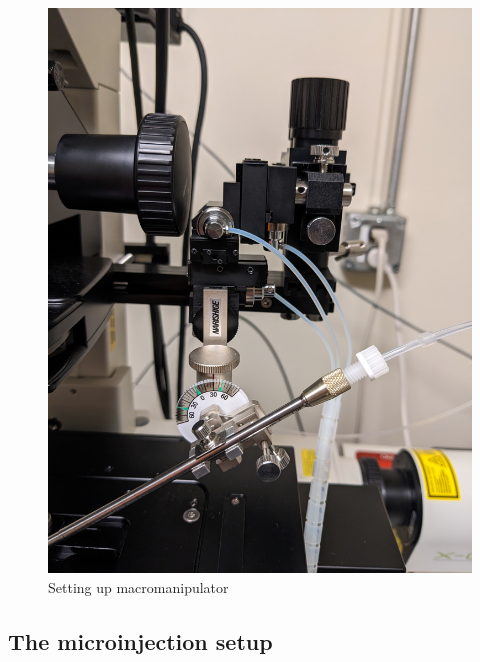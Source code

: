 \documentclass[
  letterpaper,
  DIV=11,
  numbers=noendperiod]{scrartcl}
\begin{document}
\begin{figure}
\begin{minipage}[t]{0.50\linewidth}
{{\includegraphics{micro_photos/included/needle_holder3.jpg}

}

}

\end{minipage}%

\caption{\label{fig-eggs}Setting up macromanipulator}

\end{figure}

\hypertarget{the-microinjection-setup}{%
\subsection{The microinjection setup}\label{the-microinjection-setup}}
\end{document}
